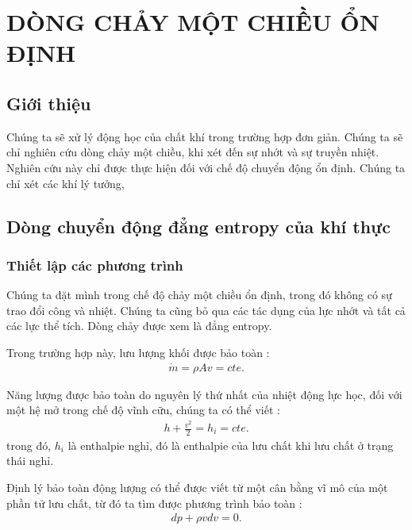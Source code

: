 \documentclass[DONG_CHAY_NEN_DUOC.tex]{subfiles}
\begin{document}
\chapter{DÒNG CHẢY MỘT CHIỀU ỔN ĐỊNH}
\section{Giới thiệu}
Chúng ta sẽ xử lý động học của chất khí trong trường hợp đơn giản. Chúng ta sẽ chỉ nghiên cứu dòng chảy một chiều, khi xét đến sự nhớt và sự truyền nhiệt. Nghiên cứu này chỉ được thực hiện đối với chế độ chuyển động ổn định. Chúng ta chỉ xét các khí lý tưởng, 

\section{Dòng chuyển động đẳng entropy của khí thực}
\subsection{Thiết lập các phương trình}

Chúng ta đặt mình trong chế độ chảy một chiều ổn định, trong đó không có sự trao đổi công và nhiệt. Chúng ta cũng bỏ qua các tác dụng của lực nhớt và tất cả các lực thể tích. Dòng chảy được xem là đẳng entropy.

Trong trường hợp này, lưu lượng khối được bảo toàn :
\begin{equation}
	\begin{aligned}
 		\dot{m} = \rho A v = cte.
	\end{aligned}
\end{equation}

Năng lượng được bảo toàn do nguyên lý thứ nhất của nhiệt động lực học, đối với một hệ mở trong chế độ vĩnh cữu, chúng ta có thể viết :
\begin{equation}
	\begin{aligned}
 		h + \frac{v^2}{2} = h_i = cte.
	\end{aligned}
\end{equation}
trong đó, $h_i$ là enthalpie nghỉ, đó là enthalpie của lưu chất khi lưu chất ở trạng thái nghỉ.

Định lý bảo toàn động lượng có thể được viết từ một cân bằng vĩ mô của một phần tử lưu chất, từ đó ta tìm được phương trình bảo toàn :
\begin{equation}
	\begin{aligned}
 		dp + \rho vdv = 0.
	\end{aligned}
\end{equation}
\end{document}
